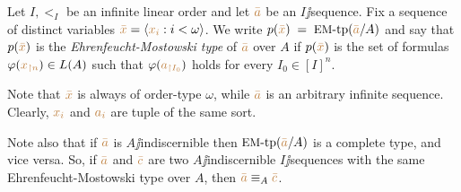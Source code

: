 \documentclass[creche.tex]{subfiles}
\begin{document}
Let $I,<_I$ be an infinite linear order and let ${\color{brown}\bar a}$ be an $I\jj$sequence.
Fix a sequence of distinct variables ${\color{brown}\bar x}=\langle{\color{brown}x_i}: i<\omega\rangle$.
We write \emph{$p({\color{brown}\bar x})\;=\;\textrm{{\small EM}-tp}({\color{brown}\bar a}/A)$} and say that $p({\color{brown}\bar x})$ is the \emph{Ehren\-feucht-Mostowski type\/} of ${\color{brown}\bar a}$ over $A$ if $p({\color{brown}\bar x})$ is the set of formulas $\varphi({\color{brown} x_{\restriction n}})\in L(A)$ such that $\varphi({\color{brown} a_{\restriction I_0}})$ holds for every $I_0\in [I]^n$.


Note that ${\color{brown}\bar x}$ is always of order-type $\omega$, while ${\color{brown}\bar a}$ is an arbitrary infinite sequence.
Clearly, ${\color{brown} x_i}$ and  ${\color{brown} a_i}$ are tuple of the same sort.

Note also that if ${\color{brown}\bar a}$ is $A\jj$indiscernible then $\textrm{{\small EM}\mbox{-}tp}({\color{brown}\bar a}/A)$ is a complete type, and vice versa.
So, if ${\color{brown}\bar a}$ and ${\color{brown}\bar c}$ are two $A\jj$indiscernible $I\jj$sequences with the same Ehren\-feucht-Mostowski type over $A$, then ${\color{brown}\bar a}\equiv_A {\color{brown}\bar c}$.
 
\end{document}
